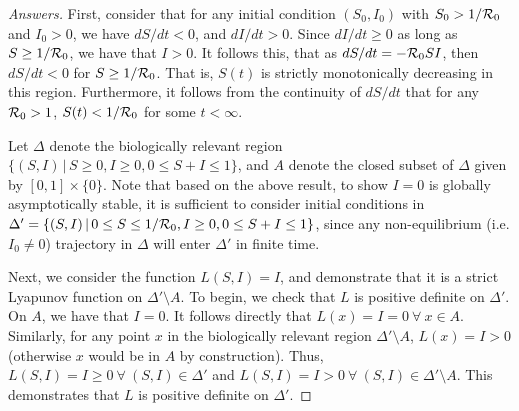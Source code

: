 \documentclass[12pt]{article}
\begin{document}
\begin{enumerate}[(a)]
{\color{blue}
\begin{proof}[Answers]
First, consider that for any initial condition $(S_0, I_0)$ with $S_0 > 1/{\cal R}_0$ and $I_0 >0$, we have $dS/dt < 0$, and $dI/dt > 0$. Since $dI/dt \geq 0$ as long as $S \geq 1/{\cal R}_0$, we have that $I >0$. It follows this, that as $dS/dt=-{\cal R}_0SI$, then $dS/dt < 0$ for $S \geq 1/{\cal R}_0$. That is, $S(t)$ is strictly monotonically decreasing in this region. Furthermore, it follows from the continuity of $dS/dt$ that for any $ {\cal R}_0 > 1$, $S(t) < 1/{\cal R}_0$ for some $t < \infty$.



Let $\Delta$ denote the biologically relevant region $ \{ (S, I) \, | \, S \geq 0, I \geq 0, 0 \leq S+I \leq 1 \}$, and $A$ denote the closed subset of $\Delta$ given by $[0, 1] \times \{0\}$. Note that based on the above result, to show $I =0$ is globally asymptotically stable, it is sufficient to consider initial conditions in $\Delta' = \{ (S, I) \, | \, 0 \leq S \leq 1/{\cal R}_0, I \geq 0, 0 \leq S+I \leq 1 \}$, since any non-equilibrium (i.e. $I_0 \neq 0$) trajectory in $\Delta$ will enter $\Delta'$ in finite time.

Next, we consider the function $L(S,I)=I$, and demonstrate that it is a strict Lyapunov function on $\Delta' \setminus A$. To begin, we check that $L$ is positive definite on $\Delta'$.
On $A$, we have that $I = 0$. It follows directly that $L(x)= I = 0 \ \forall \ x \in A$. Similarly, for any point $x$ in the biologically relevant region $\Delta' \setminus A$, $L(x) = I > 0$ (otherwise $x$ would be in $A$ by construction). Thus, $L(S,I)=I \geq 0 \ \forall \ (S,I) \in \Delta'$ and $L(S,I)=I > 0 \ \forall \ (S,I) \in \Delta' \setminus A$. This demonstrates that $L$ is positive definite on $\Delta'$.


\end{proof}}
\end{enumerate}
\end{document}
